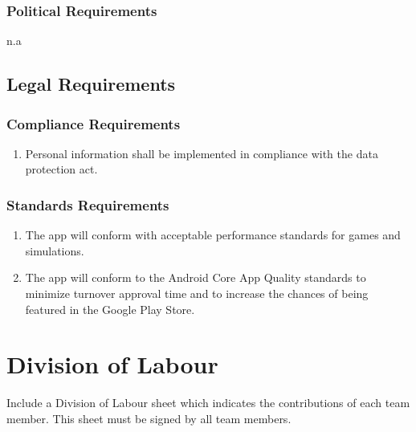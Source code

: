 \documentclass[]{article}
\begin{document}
\subsubsection{Political Requirements}
\label{ssub:political_requirements}
n.a


\subsection{Legal Requirements}
\label{sub:legal_requirements}

\subsubsection{Compliance Requirements}
\label{ssub:compliance_requirements}
\begin{enumerate}[{LR}1. ]
	\item Personal information shall be implemented in compliance with the data protection act.
	\holdEnum
\end{enumerate}

\subsubsection{Standards Requirements}
\label{ssub:standards_requirements}
\begin{enumerate}[{LR}1. ]
	\resumeEnum
	\item The app will conform with acceptable performance standards for games and simulations.
	\item The app will conform to the Android Core App Quality standards to minimize turnover approval time and to increase the chances of being featured in the Google Play Store.
\end{enumerate}



\appendix
\section{Division of Labour}
\label{sec:division_of_labour}
Include a Division of Labour sheet which indicates the contributions of each team member. This sheet must be signed by all team members.
\nocite{MDes}
\nocite{CAQ}
\newpage
\end{document}
